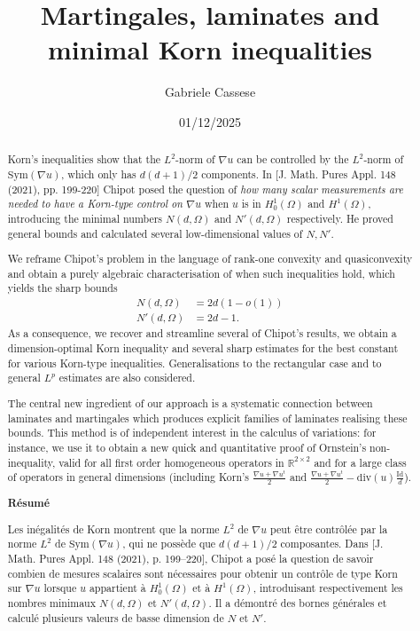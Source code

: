\documentclass[11pt, a4paper, reqno]{elsarticle}
\theoremstyle{definition}
\theoremstyle{remark}
\begin{document}
\begin{frontmatter}
    \author{Gabriele Cassese}

\date{01/12/2025}

\title{Martingales, laminates and minimal Korn inequalities}

\begin{abstract}
Korn's inequalities show that the $L^2$-norm of $\nabla u$
can be controlled by the $L^2$-norm of $\mathrm{Sym}(\nabla u)$, which only has $d(d+1)/2$ components. In [J. Math. Pures Appl. 148 (2021), pp. 199-220] Chipot
posed the question of \textit{how many scalar measurements are needed to have a 
Korn-type control on $\nabla u$} when $u$ is in $H_0^1(\Omega)$ and $H^1(\Omega)$, introducing the minimal numbers $N(d,\Omega)$ and $N'(d,\Omega)$
respectively. He proved general bounds and calculated several low-dimensional values of $N,N'$.

We reframe Chipot's problem in the language of rank-one convexity and quasiconvexity and obtain a purely algebraic characterisation of 
when such inequalities hold, which yields the sharp bounds
\begin{align*}
    N(d,\Omega)&=2d(1-o(1))\\ N'(d,\Omega)&=2d-1.
\end{align*} 
As a consequence, we recover and streamline several of Chipot's results,
we obtain a dimension-optimal Korn inequality and 
several sharp estimates for the best constant for various Korn-type inequalities. Generalisations to the rectangular case
and to general $L^p$ estimates are also considered.\par
The central new ingredient of our approach is a systematic connection
between laminates and martingales which produces explicit
families of laminates realising these bounds. This method is of 
independent interest in the calculus of variations: for instance, we use it to obtain a new quick and quantitative proof of Ornstein's
non-inequality, valid for all first order homogeneous operators in $\mathbb{R}^{2\times 2}$ and for a large
class of operators in general dimensions (including Korn's $\frac{\nabla u+\nabla u^t}2$ and $\frac{\nabla u+\nabla u^t}2-\mathrm{div}(u)\frac{\mathrm{Id}}d$).\par
\medskip
\noindent\textbf{Résumé}\par\medskip
Les inégalités de Korn montrent que la norme $L^2$ de $\nabla u$ peut être contrôlée par la norme $L^2$ de $\mathrm{Sym}(\nabla u)$, qui ne possède que $d(d+1)/2$ composantes. Dans [J. Math. Pures Appl. 148 (2021), p. 199–220], Chipot a posé la question de savoir combien de mesures scalaires sont nécessaires pour obtenir un contrôle de type Korn sur $\nabla u$ lorsque $u$ appartient à $H_0^1(\Omega)$ et à $H^1(\Omega)$, introduisant respectivement les nombres minimaux $N(d,\Omega)$ et $N'(d,\Omega)$. Il a démontré des bornes générales et calculé plusieurs valeurs de basse dimension de $N$ et $N'$.


\end{abstract}
\end{frontmatter}
\end{document}
